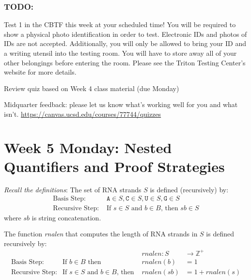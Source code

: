 \documentclass[12pt, oneside]{article}
\newcommand{\A}[0]{\texttt{A}}
\newcommand{\C}[0]{\texttt{C}}
\newcommand{\G}[0]{\texttt{G}}
\newcommand{\U}[0]{\texttt{U}}
\begin{document}
\subsubsection*{TODO:}
\begin{list}{\itemsep2pt}
    \item Test 1 in the CBTF this week at your scheduled time!
You will be required to show a physical photo identification in order
to test. Electronic IDs and photos of IDs are not accepted. Additionally, you will only be allowed
to bring your ID and a writing utensil into the testing room. You will have to store away all of
your other belongings before entering the room. Please see the Triton Testing Center's website
for more details.
    \item Review quiz based on Week 4 class material (due Monday)
    \item Midquarter feedback: please let us know what's working well for you and what isn't.  \url{https://canvas.ucsd.edu/courses/77744/quizzes}
\end{list}
\newpage

\section*{Week 5 Monday: Nested Quantifiers and Proof Strategies}


{\it Recall the definitions}: The set of RNA strands $S$ is defined (recursively) by:
\[
\begin{array}{ll}
\textrm{Basis Step: } & \A \in S, \C \in S, \U \in S, \G \in S \\
\textrm{Recursive Step: } & \textrm{If } s \in S\textrm{ and }b \in B \textrm{, then }sb \in S
\end{array}
\]
where $sb$ is string concatenation.

The function \textit{rnalen} that computes the length of RNA strands in $S$ is defined recursively by:
\[
\begin{array}{llll}
& & \textit{rnalen} : S & \to \mathbb{Z}^+ \\
\textrm{Basis Step:} & \textrm{If } b \in B\textrm{ then } & \textit{rnalen}(b) & = 1 \\
\textrm{Recursive Step:} & \textrm{If } s \in S\textrm{ and }b \in B\textrm{, then  } & \textit{rnalen}(sb) & = 1 + \textit{rnalen}(s)
\end{array}
\]
\end{document}
